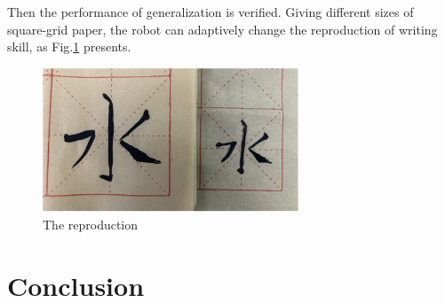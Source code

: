 \documentclass[conference]{IEEEtran}
\begin{document}
Then the performance of generalization is verified. Giving different sizes of square-grid paper, the robot can adaptively change the reproduction of writing skill, as Fig.\ref{fig9} presents.
\begin{figure}[!t]
    \centering
    \includegraphics[width=3in]{./fig/fig9.pdf}
    \caption{The reproduction}
    \label{fig9}
\end{figure}

\section{Conclusion}








\end{document}
